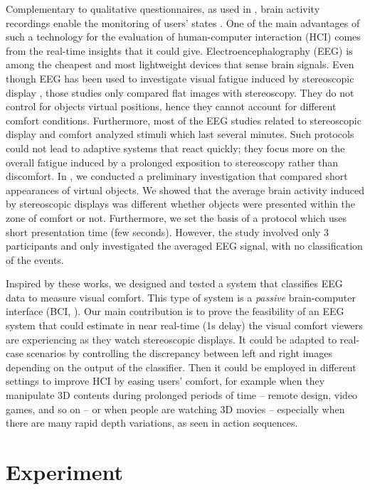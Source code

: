 \documentclass{template/llncs}
\begin{document}
Complementary to qualitative questionnaires, as used in \cite{Shibata2011}, brain activity recordings enable the monitoring of users' states \cite{Frey2014a,Zander2011}. One of the main advantages of such a technology for the evaluation of human-computer interaction (HCI) comes from the real-time insights that it could give. 
Electroencephalography (EEG) is among the cheapest and most lightweight devices that sense brain signals. Even though EEG has been used to investigate visual fatigue induced by stereoscopic display \cite{Li2008a,Cho2012,Bang2014}, those studies only compared flat images with stereoscopy. They do not control for objects virtual positions, hence they cannot account for different comfort conditions. Furthermore, most of the EEG studies related to stereoscopic display and comfort analyzed stimuli which last several minutes. Such protocols could not lead to adaptive systems that react quickly; they focus more on the overall fatigue induced by a prolonged exposition to stereoscopy rather than discomfort. In \cite{Frey2014}, we conducted a preliminary investigation that compared short appearances of virtual objects. We showed that the average brain activity induced by stereoscopic displays was different whether objects were presented within the zone of comfort or not. 
Furthermore, we set the basis of a protocol which uses short presentation time (few seconds). However, the study involved only 3 participants and only investigated the averaged EEG signal, with no classification of the events.

Inspired by these works, we designed and tested a system that classifies EEG data to measure visual comfort. This type of system is a \emph{passive} brain-computer interface (BCI, \cite{Zander2011}). 
Our main contribution is to prove the feasibility of an EEG system that could estimate in near real-time (1s delay) the visual comfort viewers are experiencing as they watch stereoscopic displays. It could be adapted to real-case scenarios by controlling the discrepancy between left and right images depending on the output of the classifier. Then it could be employed in different settings to improve HCI by easing users' comfort, for example when they manipulate 3D contents during prolonged periods of time -- remote design, video games, and so on -- or when people are watching 3D movies -- especially when there are many rapid depth variations, as seen in action sequences.

\section{Experiment}\label{experiment}
\end{document}
